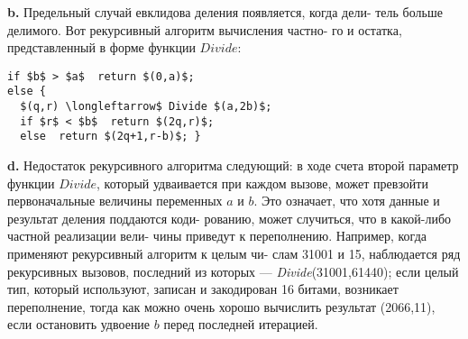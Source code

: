 \textbf{b.} Предельный случай евклидова деления появляется, когда дели-\linebreak
тель больше делимого. Вот рекурсивный алгоритм вычисления частно-\linebreak
го и остатка, представленный в форме функции $Divide$:
\begin{lstlisting}[frame=single, mathescape=true]
if $b$ > $a$  return $(0,a)$;
else {
  $(q,r) \longleftarrow$ Divide $(a,2b)$;
  if $r$ < $b$  return $(2q,r)$;
  else  return $(2q+1,r-b)$; }
\end{lstlisting}
\hspace*{15pt}\textbf{d.} Недостаток рекурсивного алгоритма следующий: в ходе счета\linebreak
второй параметр функции $Divide$, который удваивается при каждом\linebreak
вызове, может превзойти первоначальные величины переменных $a$ и $b$.\linebreak
Это означает, что хотя данные и результат деления поддаются коди-\linebreak
рованию, может случиться, что в какой-либо частной реализации вели-\linebreak
чины приведут к переполнению.\newline
\hspace*{15pt}Например, когда применяют рекурсивный алгоритм к целым чи-\linebreak
слам 31001 и 15, наблюдается ряд рекурсивных вызовов, последний из\linebreak
которых — \textit{Divide}(31001,61440); если целый тип, который используют,\linebreak
записан и закодирован 16 битами, возникает переполнение, тогда как\linebreak
можно очень хорошо вычислить результат (2066,11), если остановить\linebreak
удвоение $b$ перед последней итерацией.\newline
